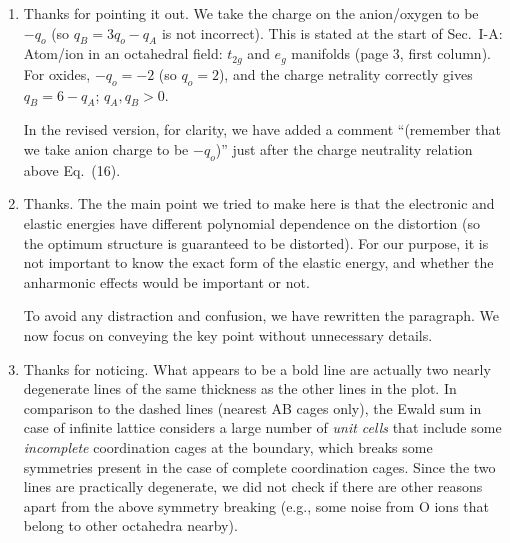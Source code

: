 \documentclass[a4paper,prb]{revtex4-1}  %
\newcommand{\rev}[1]{{\color{blue}{#1}}}
\begin{document}
\begin{enumerate}
\item
\rev{It is not clearly explained how exactly the authors define sign of
q0, qA,qB. E.g. the charge neutrality relation mentioned above (16) is
$qB = 3q0 - qA$. For oxides q0 is -2 and $qA>0$ and does not typically
exceed +4, but then $qB<0$. Obviously the authors used some other
conventions, but do not really explain this.
}

Thanks for pointing it out.
We take the charge on the anion/oxygen to be $-q_o$ (so $q_B=3q_o-q_A$ is not incorrect).
This is stated at the start of  
Sec.~I-A: Atom/ion in an octahedral field: $t_{2g}$  and $e_g$ manifolds (page 3, first column).
For oxides, $-q_o=-2$ (so $q_o=2$), and the charge netrality correctly gives $q_B=6-q_A$;
$q_A, q_B >0$. 


In the revised version,
for clarity,
we have added a comment ``(remember that we take anion charge to be $-q_o$)''
just after the charge neutrality relation above Eq.~(16).


\item
\rev{
I'm not sure that it is clear for a general reader why from volume
dependence $V = a^3 (\delta_1 + \delta_2)$ follows that the elastic energy
must be proportional to $(\delta_1 + \delta_2)^2$ [BTW one of the
subscripts is wrong]. OK, they know from the high-school courses that
the elastic term must quadratic and could agree, but why the same
logic applies to $(\alpha^2 + \beta^2)^2$ can be not clear. Moreover,
it's not clear a priori why there is no cubic terms. Please explain
this part in more detail.
}

Thanks. 
The the main point we
tried to make here is that 
the electronic and elastic energies have different 
polynomial dependence on the distortion (so the optimum structure is guaranteed to be distorted).
For our purpose, it is not important to know the exact form of the elastic energy, and whether the anharmonic effects would be important or not.

To avoid any distraction and confusion,
we have rewritten the paragraph. 
We now focus
on conveying the key point without
unnecessary details.




\item
\rev{
Fig. 7. Should not be there explained what a bold line means? And
why there is no a bold line for dashed curves?
}


Thanks for noticing. 
What appears to be a bold line are actually two nearly degenerate lines of the same thickness as the other lines in the plot.
In comparison to the dashed lines (nearest AB cages only), 
the Ewald sum
in case of infinite lattice considers
a large number of \emph{unit cells}
that include some \emph{incomplete}
coordination cages at the boundary, 
 which breaks some symmetries present in the 
 case of complete coordination cages.
 Since the two lines are practically degenerate,
 we did not check if there are other reasons apart from the above symmetry breaking (e.g., some noise from O ions that belong to other octahedra nearby).



\end{enumerate}
\end{document}
